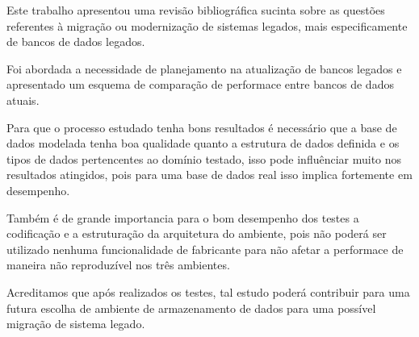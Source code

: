 Este trabalho apresentou uma revisão bibliográfica sucinta sobre as questões referentes à migração ou modernização de sistemas legados, mais especificamente de bancos de dados legados. 

Foi abordada a necessidade de planejamento na atualização de bancos legados e apresentado um esquema de comparação de performace entre bancos de dados atuais.

Para que o processo estudado tenha bons resultados é necessário que a base de dados modelada tenha boa qualidade quanto a estrutura de dados definida e os tipos de dados pertencentes ao domínio testado, isso pode influênciar muito nos resultados atingidos, pois para uma base de dados real isso implica fortemente em desempenho.

Também é de grande importancia para o bom desempenho dos testes a codificação e a estruturação da arquitetura do ambiente, pois não poderá ser utilizado nenhuma funcionalidade de fabricante para não afetar a performace de maneira não reproduzível nos três ambientes.

Acreditamos que após realizados os testes, tal estudo poderá contribuir para uma futura escolha de ambiente de armazenamento de dados para uma possível migração de sistema legado.


